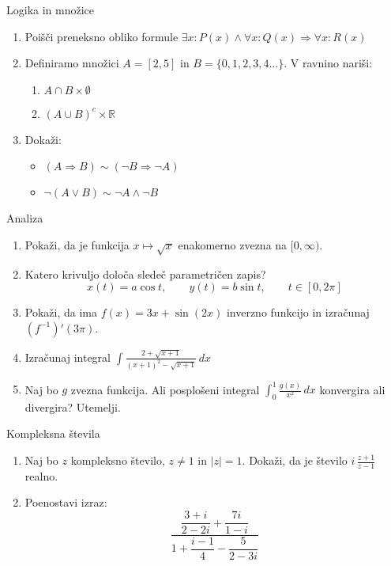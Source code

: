 \begin{frame}{Logika in množice}
	\begin{enumerate}
		\item
		Poišči preneksno obliko formule $\exists x: P(x) \land \forall x: Q(x) \Rightarrow \forall x : R(x)$
		\item 
		Definiramo množici $A=[2,5]$ in $B=\{0,1,2,3,4\ldots\}$.
		V ravnino nariši:
		\begin{enumerate}
		   \item $A \cap B \times \emptyset$
		   \item $(A \cup B)^c \times \mathbb{R}$
		\end{enumerate}
		\item
		Dokaži:
		\begin{itemize}
			\item $(A \Rightarrow B) \sim (\neg B \Rightarrow \neg A)$
			\item $\neg (A \vee B) \sim \neg A \wedge \neg B$
		\end{itemize}
	\end{enumerate}
\end{frame}

\begin{frame}{Analiza}
	\begin{enumerate}
		\item
		Pokaži, da je funkcija $x \mapsto \sqrt{x}$ enakomerno zvezna na $[0, \infty)$.
		\item 
		Katero krivuljo določa sledeč parametričen zapis?
		$$
		   x(t) = a \cos t, \qquad %
		   y(t) = b \sin t, \qquad %
		   t \in [0, 2 \pi]
		$$ 
		\item
		Pokaži, da ima $f(x) = 3x + \sin(2x)$ inverzno funkcijo in izračunaj $(f^{-1})'(3\pi)$.
		
		\item
		Izračunaj integral 
		$ \displaystyle\int\frac{2+\sqrt{x+1}}{(x+1)^2-\sqrt{x+1}} \,dx$
		\item 
		Naj bo $g$ zvezna funkcija. Ali posplošeni integral 
		$\int_0^1 \frac{g(x)}{x^2} \, dx$
		konvergira ali divergira? Utemelji.
	\end{enumerate}
\end{frame}

\begin{frame}{Kompleksna števila}
	\begin{enumerate}
		\item
		Naj bo $z$ kompleksno število, $z \ne 1$ in $|z|=1$.
		Dokaži, da je število \( i \, \frac{z+1}{z-1} \) realno.
		\item
		Poenostavi izraz:
		$$
			\frac{\dfrac{3+i}{2-2i}+\dfrac{7i}{1-i}}{1+\dfrac{i-1}{4}-\dfrac{5}{2-3i}}
		$$
	\end{enumerate}
\end{frame}